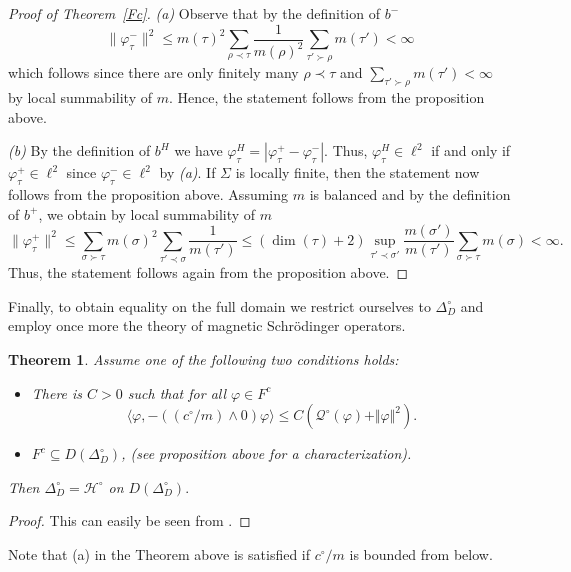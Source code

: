 \documentclass[10pt]{amsart}
\newtheorem{theorem}{Theorem}[section]
\theoremstyle{definition}
\newcommand{\F}{{F}}
\renewcommand{\bullet}{{\circ}}
\begin{document}
\begin{proof}[Proof of Theorem~\ref{Fc}]
\emph{(a)} Observe that by the definition of $b^{-}$
\begin{equation*}
	\|\varphi_{\tau}^{-}\|^{2}\leq m(\tau)^{2}\sum_{\rho\prec\tau}\frac{1}{m(\rho)^{2}}\sum_{\tau'\succ \rho}m(\tau')<\infty
\end{equation*}
which follows since there are only finitely many $\rho\prec \tau$ and $\sum_{\tau'\succ \rho}m(\tau')<\infty$ by local summability of $m$. Hence, the statement follows from the proposition above.

\emph{(b)} By the definition of $b^{H}$ we have $\varphi_{\tau}^{H}=|\varphi_{\tau}^{+}-\varphi_{\tau}^{-}|$. Thus, $\varphi_{\tau}^{H}\in \ell^{2}$ if and only if $\varphi_{\tau}^{+}\in\ell^{2}$ since $\varphi_{\tau}^{-}\in\ell^{2}$ by \emph{(a)}. If $\Sigma$ is locally finite, then the statement now follows from the proposition above. Assuming $m$ is balanced  and by the definition of $b^{+}$, we obtain by local summability of $m$
\begin{equation*}
	\|\varphi_{\tau}^{+}\|^{2}\leq\sum_{\sigma\succ\tau}m(\sigma)^{2}
	\sum_{\tau'\prec \sigma}\frac{1}{m(\tau')}\leq (\dim(\tau)+2)\sup_{\tau'\prec \sigma'} \frac{m(\sigma')}{m(\tau')} \sum_{\sigma\succ\tau}m(\sigma) <\infty.
\end{equation*}
Thus, the statement follows again from the proposition above.
\end{proof}

Finally, to obtain equality on the full domain we restrict ourselves to $\Delta^\bullet_{D}$ and employ once more the theory of magnetic Schrödinger operators. %



\begin{theorem}\label{action3}
Assume one of the following two conditions holds:
\begin{itemize}
    \item [(a)] There is $C>0$ such that for all $\varphi\in \F^c$ $$\langle \varphi,-((c^\bullet\slash m)\wedge 0)\varphi\rangle\leq C(\mathcal{Q}^\bullet(\varphi)+\Vert\varphi\Vert^2).$$
    \item[(b)]  $\F^{c}\subseteq D(\Delta^{\circ}_{D})$,  (see proposition above for a characterization).
\end{itemize}
Then $\Delta^\bullet_{D}=\mathcal{H}^\bullet$ on $D(\Delta_{D}^{\bullet}).$
\end{theorem}
\begin{proof}
    This can easily be seen from \cite[Theorem 2.12]{GKS}.
\end{proof}
Note that (a) in the Theorem above is satisfied if $c^\bullet\slash m$ is bounded from below.
\end{document}
